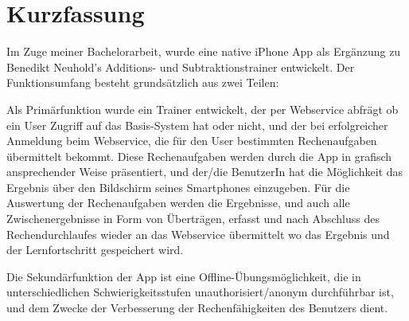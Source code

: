 

\chapter*{Kurzfassung}
\label{cha:abstract}



Im Zuge meiner Bachelorarbeit, wurde eine native iPhone App als Ergänzung
zu Benedikt Neuhold's Additions- und Subtraktionstrainer entwickelt. 
Der Funktionsumfang besteht grundsätzlich aus zwei Teilen: 

Als Primärfunktion wurde ein Trainer entwickelt, der per Webservice abfrägt 
ob ein User Zugriff auf das Basis-System hat oder nicht, und der bei erfolgreicher Anmeldung beim 
Webservice, die für den User bestimmten Rechenaufgaben übermittelt bekommt.
Diese Rechenaufgaben werden durch die App in grafisch ansprechender Weise präsentiert,
und der/die BenutzerIn hat die Möglichkeit das Ergebnis über den Bildschirm seines Smartphones einzugeben.
Für die Auswertung der Rechenaufgaben werden die Ergebnisse, und auch alle Zwischenergebnisse 
in Form von Überträgen, erfasst und nach Abschluss des Rechendurchlaufes wieder 
an das Webservice übermittelt wo das Ergebnis und der Lernfortschritt gespeichert wird.

Die Sekundärfunktion der App ist eine Offline-Übungsmöglichkeit, die in unterschiedlichen 
Schwierigkeitsstufen unauthorisiert/anonym durchführbar ist, und dem Zwecke der Verbesserung
der Rechenfähigkeiten des Benutzers dient. 



